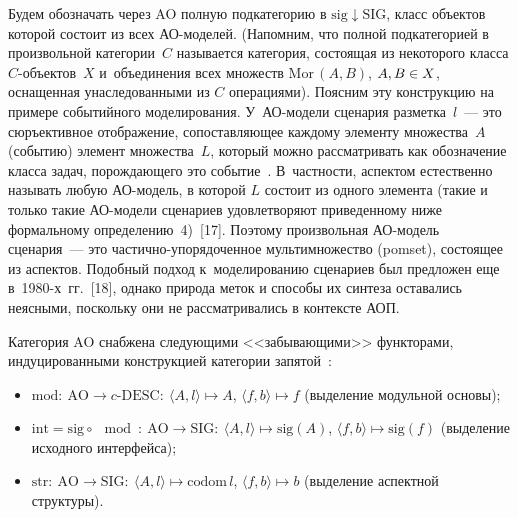 \begin{multicols}{2}
 Будем обозначать через AO полную подкатегорию в $\mathrm{sig}\downarrow \mathrm{SIG}$,
класс объектов которой состоит из всех АО-моделей. (Напомним, что полной
подкатегорией в произвольной категории~$C$ называется категория, состоящая
из некоторого класса $C$-объ\-ек\-тов~$X$ и~объединения всех множеств $\mathrm{Mor}\,(A,
B)$, $A, B \hm\in X$, оснащенная унаследованными из $C$ операциями).
Поясним эту конструкцию на примере событийного моделирования.
 У~АО-модели сценария разметка~$l$~--- это сюръективное отображение,
сопоставляющее каждому элементу множества~$A$ (событию) элемент
множества~$L$, который можно рассматривать как обозначение класса задач,
по\-рож\-да\-юще\-го это событие~\cite{12-kov}. В~частности, аспектом естественно
называть любую АО-модель, в которой $L$ состоит из одного элемента (такие
и только такие АО-модели сценариев удовлетворяют приведенному ниже
формальному определению~4)~[17]. Поэтому произвольная АО-модель
сценария~--- это час\-тич\-но-упо\-ря\-до\-чен\-ное мультимножество (pomset),
состоящее из аспектов. Подобный подход к~моделированию сценариев был
предложен еще в~1980-х~гг.~[18], однако природа меток и способы их синтеза
оставались неясными, поскольку они не рассматривались в контексте АОП.

 Категория AO снабжена следующими <<забыва\-ющи\-ми>> функторами,
индуцированными конструкцией категории запятой~\cite{12-kov}:
 \begin{itemize}
 \item
$\mathrm{mod}:\ \mathrm{AO} \to c\mbox{-}\mathrm{DESC}:\ \langle A, l\rangle \mapsto A$, $\langle f, b\rangle
\mapsto f$ (выделение модульной основы);
\item $\mathrm{int} = \mathrm{sig} \circ \mod:\ \mathrm{AO} \to \mathrm{SIG}:\ \langle A, l\rangle \mapsto \mathrm{sig}(A)$,
$\langle f, b\rangle \mapsto \mathrm{sig}(f)$ (выделение исходного интерфейса);
\item $\mathrm{str}:\ \mathrm{AO}\to \mathrm{SIG}:\ \langle A, l\rangle\mapsto \mathrm{codom}\, l$, $\langle f,
b\rangle\mapsto b$ (выделение аспектной структуры).
\end{itemize}


\end{multicols}
